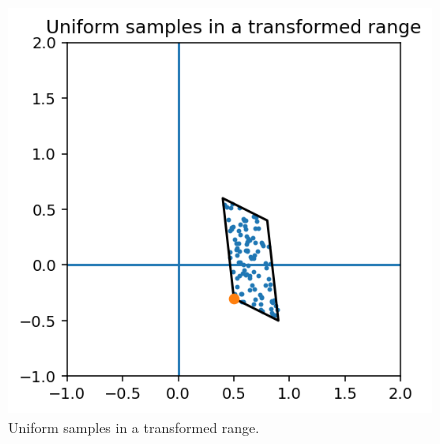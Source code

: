 \documentclass[a4paper, openany]{memoir}
\begin{document}
\begin{figure}[H]
    \centering
    \includegraphics[scale=0.5]{src/5.20 uniform samples in transformed range.png}
    \caption{Uniform samples in a transformed range.}
\end{figure}
\end{document}
